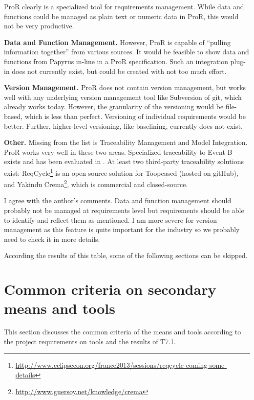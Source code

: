 \begin{author_comment}
ProR clearly is a specialized tool for requirements management.  While data and functions could be managed as plain text or numeric data in ProR, this would not be very productive.

\textbf{Data and Function Management.} However, ProR is capable of ``pulling information together'' from various sources.  It would be feasible to show data and functions from Papyrus in-line in a ProR specification.  Such an integration plug-in does not currently exist, but could be created with not too much effort.

\textbf{Version Management.} ProR does not contain version management, but works well with any underlying version management tool like Subversion of git, which already works today.  However, the granularity of the versioning would be file-based, which is less than perfect.  Versioning of individual requirements would be better.  Further, higher-level versioning, like baselining, currently does not exist.

\textbf{Other.} Missing from the list is Traceability Management and Model Integration.  ProR works very well in these two areas.  Specialized traceability to Event-B exists and has been evaluated in \cite{event_b_benchmark}.  At least two third-party traceability solutions exist: ReqCycle\footnote{\url{http://www.eclipsecon.org/france2013/sessions/reqcycle-coming-some-details}} is an open source solution for Toopcased (hosted on gitHub), and Yakindu Crema\footnote{\url{http://www.guersoy.net/knowledge/crema}}, which is commercial and closed-source.
\end{author_comment}

\begin{assessor2}
I agree with the author's comments. Data and function management should probably not be managed at requirements level but requirements should be able to identify and reflect them as mentioned. I am more severe for version management as this feature is quite important for the industry so we probably need to check it in more details.
\end{assessor2}

According the results of this table, some of the following sections can be skipped.

\section{Common criteria on secondary means and tools}
\label{common}
This section discusses the common criteria of the means and tools according to the project requirements on tools and the results of T7.1.


